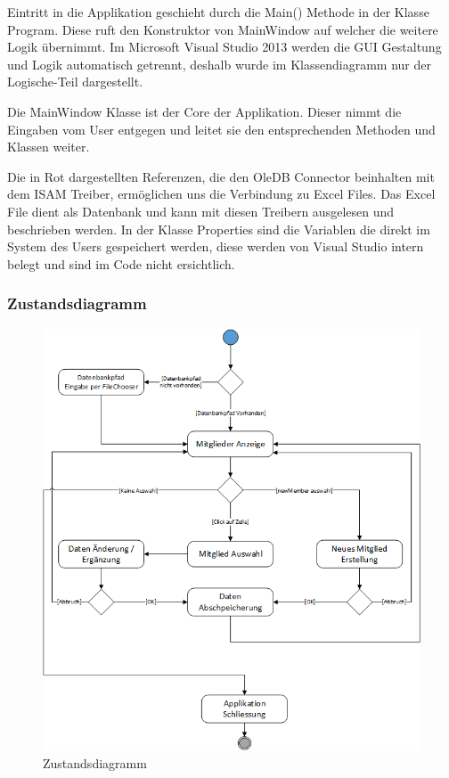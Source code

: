 \documentclass{article}
\begin{document}
Eintritt in die Applikation geschieht durch die Main() Methode in der Klasse Program. Diese ruft den Konstruktor von MainWindow auf welcher die weitere Logik übernimmt. Im Microsoft Visual Studio 2013 werden die GUI Gestaltung und Logik automatisch getrennt, deshalb wurde im Klassendiagramm nur der Logische-Teil dargestellt.

Die MainWindow Klasse ist der Core der Applikation. Dieser nimmt die Eingaben vom User entgegen und leitet sie den entsprechenden Methoden und Klassen weiter. 

Die in Rot dargestellten Referenzen, die den OleDB Connector beinhalten mit dem ISAM Treiber, ermöglichen uns die Verbindung zu Excel Files. Das Excel File dient als Datenbank und kann mit diesen Treibern ausgelesen und beschrieben werden. In der Klasse Properties sind die Variablen die direkt im System des Users gespeichert werden, diese werden von Visual Studio intern belegt und sind im Code nicht ersichtlich.

\newpage


\subsubsection{Zustandsdiagramm}
\begin{figure}[h]
	\centering
	\includegraphics[width=0.9 \textwidth]{Zustandsdiagramm}
	\caption{Zustandsdiagramm}
\end{figure}
\end{document}
